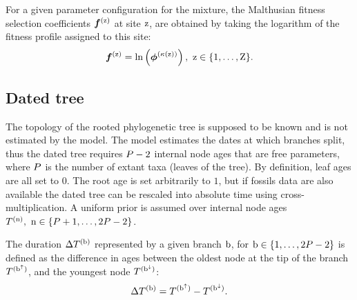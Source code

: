 \documentclass{article}
\begin{document}
For a given parameter configuration for the mixture, the Malthusian fitness selection coefficients $\bm{f}^{(\text{z})}$ at site $\text{z}$, are obtained by taking the logarithm of the fitness profile assigned to this site:
\begin{equation}
    \label{eq:sitefitness}
    \bm{f}^{(\text{z})} = \ln \left( \bm{\phi}^{\left( \kappa\left(\text{z}\right) \right)} \right),\ \text{z} \in \{1, \hdots, \text{Z}\}.
\end{equation}

\subsection{Dated tree}
The topology of the rooted phylogenetic tree is supposed to be known and is not estimated by the model.
The model estimates the dates at which branches split, thus the dated tree requires $P - 2$ internal node ages that are free parameters, where $P$ is the number of extant taxa (leaves of the tree).
By definition, leaf ages are all set to $0$.
The root age is set arbitrarily to $1$, but if fossils data are also available the dated tree can be rescaled into absolute time using cross-multiplication.
A uniform prior is assumed over internal node ages $T^{(\text{n})},\ \text{n} \in \{P + 1, \hdots, 2 P - 2\}$.

The duration $\Delta T^{(\text{b})}$ represented by a given branch $\text{b}$, for $\text{b} \in \{1, \hdots, 2 P - 2\}$ is defined as the difference in ages between the oldest node at the tip of the branch $T^{(\text{b}^{\uparrow})}$, and the youngest node $T^{(\text{b}^{\downarrow})}$:
\begin{equation}
    \label{eq:ageTobranchtime}
    \Delta T^{(\text{b})} = T^{(\text{b}^{\uparrow})} - T^{(\text{b}^{\downarrow})}.
\end{equation}
\end{document}
